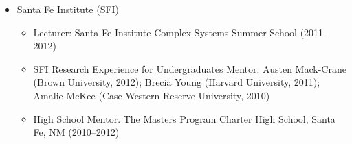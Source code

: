 \documentclass[11pt]{article}
\begin{document}
\begin{itemize}
  \item Santa Fe Institute (SFI)
    \begin{itemize}
    \item Lecturer: Santa Fe Institute Complex Systems Summer School (2011--2012)
    \item SFI Research Experience for Undergraduates Mentor: Austen Mack-Crane (Brown University, 2012); Brecia Young (Harvard University, 2011); 
      Amalie McKee (Case Western Reserve University, 2010)
    \item High School Mentor. The Masters Program Charter High School, Santa Fe, NM (2010--2012)
    \end{itemize}
  \end{itemize}
  
\end{document}
